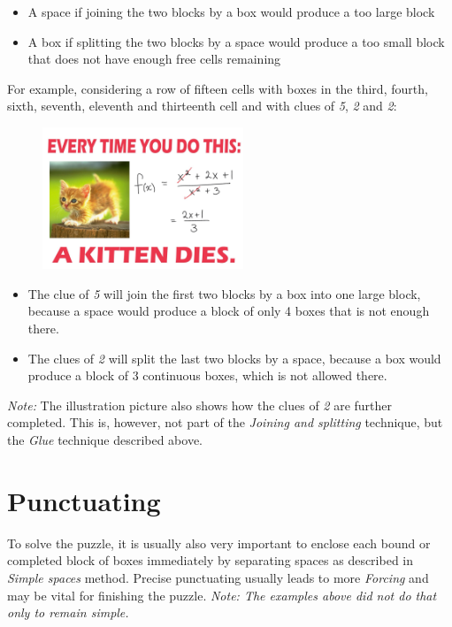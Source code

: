 \begin{itemize} 
 \item {A space if joining the two blocks by a box would produce a too large block}

\item {A box if splitting the two blocks by a space would produce a too small block that does not have enough free cells remaining} 
\end{itemize}


For example, considering a row of fifteen cells with boxes in the third, fourth, sixth, seventh, eleventh and thirteenth cell and with clues of \textit{5}, \textit{2} and \textit{2}:
\begin{figure}
\centering
\includegraphics[width=6cm]{picture/obr.jpg}
\end{figure}

\begin{itemize} 
 \item {The clue of \textit{5} will join the first two blocks by a box into one large block, because a space would produce a block of only 4 boxes that is not enough there.}

\item {The clues of \textit{2} will split the last two blocks by a space, because a box would produce a block of 3 continuous boxes, which is not allowed there.} 
\end{itemize}

\textit{Note:} The illustration picture also shows how the clues of \textit{2} are further completed. This is, however, not part of the \textit{Joining and splitting} technique, but the \textit{Glue} technique described above.


\section{Punctuating}
To solve the puzzle, it is usually also very important to enclose each bound or completed block of boxes immediately by separating spaces as described in \textit{Simple spaces} method. Precise punctuating usually leads to more \textit{Forcing} and may be vital for finishing the puzzle. \textit{Note: The examples above did not do that only to remain simple.}


